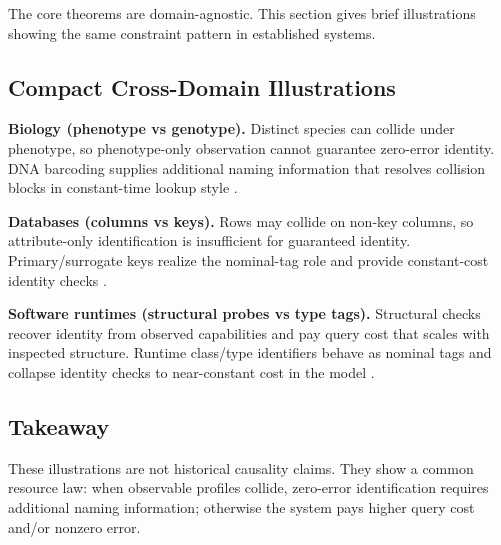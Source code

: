 The core theorems are domain-agnostic. This section gives brief illustrations showing the same constraint pattern in established systems.

\subsection{Compact Cross-Domain Illustrations}

\textbf{Biology (phenotype vs genotype).} Distinct species can collide under phenotype, so phenotype-only observation cannot guarantee zero-error identity. DNA barcoding supplies additional naming information that resolves collision blocks in constant-time lookup style \cite{DNABarcoding}.

\textbf{Databases (columns vs keys).} Rows may collide on non-key columns, so attribute-only identification is insufficient for guaranteed identity. Primary/surrogate keys realize the nominal-tag role and provide constant-cost identity checks \cite{Codd1990}.

\textbf{Software runtimes (structural probes vs type tags).} Structural checks recover identity from observed capabilities and pay query cost that scales with inspected structure. Runtime class/type identifiers behave as nominal tags and collapse identity checks to near-constant cost in the model \cite{CPythonDocs,JVMSpec,JavaDocs,TypeScriptDocs,RustDocs}.

\subsection{Takeaway}

These illustrations are not historical causality claims. They show a common resource law: when observable profiles collide, zero-error identification requires additional naming information; otherwise the system pays higher query cost and/or nonzero error.
